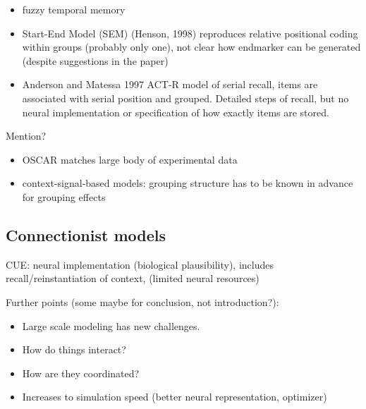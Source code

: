 \begin{itemize}
    \item fuzzy temporal memory
    \item Start-End Model (SEM) (Henson, 1998) reproduces relative positional coding within groups (probably only one), not clear how endmarker can be generated (despite suggestions in the paper)
    \item Anderson and Matessa 1997 ACT-R model of serial recall, items are associated with serial position and grouped. Detailed steps of recall, but no neural implementation or specification of how exactly items are stored.
\end{itemize}


Mention?
\begin{itemize}
    \item OSCAR matches large body of experimental data
    \item context-signal-based models: grouping structure has to be known in advance for grouping effects
\end{itemize}


\subsection{Connectionist models}


CUE\@: neural implementation (biological plausibility), includes recall/reinstantiation of context, (limited neural resources)


Further points (some maybe for conclusion, not introduction?):
\begin{itemize}
    \item Large scale modeling has new challenges.
    \item How do things interact?
    \item How are they coordinated?
    \item Increases to simulation speed (better neural representation, optimizer)
\end{itemize}
